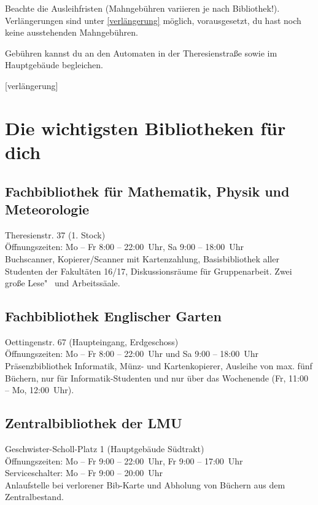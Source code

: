 Beachte die Ausleihfristen (Mahngebühren variieren je nach Bibliothek!). 
Verlängerungen sind unter \ref{verlängerung}
möglich, vorausgesetzt, du hast noch keine ausstehenden Mahngebühren.

Gebühren kannst du an den Automaten in der Theresienstraße sowie
im Hauptgebäude begleichen.

\begin{urlList}
	[verlängerung]
\end{urlList}

\section{Die wichtigsten Bibliotheken für dich}

\subsection*{Fachbibliothek für Mathematik, Physik und Meteorologie\subjectList{\subjectM\subjectW\subjectP}}
Theresienstr. 37 (1. Stock)\\
Öffnungszeiten: Mo -- Fr 8:00 -- 22:00~Uhr, Sa 9:00 -- 18:00~Uhr\\
Buchscanner, Kopierer/Scanner mit Kartenzahlung, Basisbibliothek aller
Studenten der Fakultäten 16/17, Diskussionsräume für Gruppenarbeit.
Zwei große Lese"~ und Arbeitssäale.

\subsection*{Fachbibliothek Englischer Garten\subjectList{\subjectI\subjectMI}}
Oettingenstr. 67 (Haupteingang, Erdgeschoss)\\
Öffnungszeiten: Mo -- Fr 8:00 -- 22:00~Uhr und Sa 9:00 -- 18:00~Uhr\\
Präsenzbibliothek Informatik, Münz- und Kartenkopierer, Ausleihe von max. fünf Büchern, nur für Informatik-Studenten und nur über das Wochenende (Fr, 11:00 -- Mo, 12:00~Uhr).

\subsection*{Zentralbibliothek der LMU}
Geschwister-Scholl-Platz 1 (Hauptgebäude Südtrakt)\\
Öffnungszeiten: Mo -- Fr 9:00 -- 22:00~Uhr, Fr 9:00 -- 17:00~Uhr\\
Serviceschalter: Mo -- Fr 9:00 -- 20:00~Uhr\\
Anlaufstelle bei verlorener Bib-Karte und Abholung von Büchern aus dem Zentralbestand.

